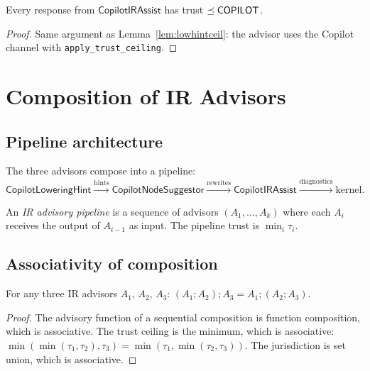 \documentclass[11pt]{article}
\newcommand{\LowHint}{\mathsf{CopilotLoweringHint}}
\newcommand{\NodeSugg}{\mathsf{CopilotNodeSuggestor}}
\newcommand{\IRAssist}{\mathsf{CopilotIRAssist}}
\begin{document}
\begin{lemma}\label{lem:irassistceil}
Every response from $\IRAssist$ has trust $\preceq \mathsf{COPILOT}$.
\end{lemma}
\begin{proof}
Same argument as Lemma~\ref{lem:lowhintceil}: the advisor
uses the Copilot channel with \texttt{apply\_trust\_ceiling}.
\end{proof}

\section{Composition of IR Advisors}\label{sec:composition}

\subsection{Pipeline architecture}

The three advisors compose into a pipeline:
\[
  \LowHint \xrightarrow{\text{hints}}
  \NodeSugg \xrightarrow{\text{rewrites}}
  \IRAssist \xrightarrow{\text{diagnostics}}
  \text{kernel}.
\]

\begin{definition}\label{def:irpipeline}
An \emph{IR advisory pipeline} is a sequence of advisors
$(A_1, \ldots, A_k)$ where each $A_i$ receives the output
of $A_{i-1}$ as input.  The pipeline trust is
$\min_i \tau_i$.
\end{definition}

\subsection{Associativity of composition}

\begin{lemma}%
\label{lem:pipeassoc}
For any three IR advisors $A_1$, $A_2$, $A_3$:
$(A_1 \mathbin{;} A_2) \mathbin{;} A_3 =
A_1 \mathbin{;} (A_2 \mathbin{;} A_3)$.
\end{lemma}
\begin{proof}
The advisory function of a sequential composition is
function composition, which is associative.  The trust
ceiling is the minimum, which is associative:
$\min(\min(\tau_1, \tau_2), \tau_3) =
\min(\tau_1, \min(\tau_2, \tau_3))$.
The jurisdiction is set union, which is associative.
\end{proof}
\end{document}
